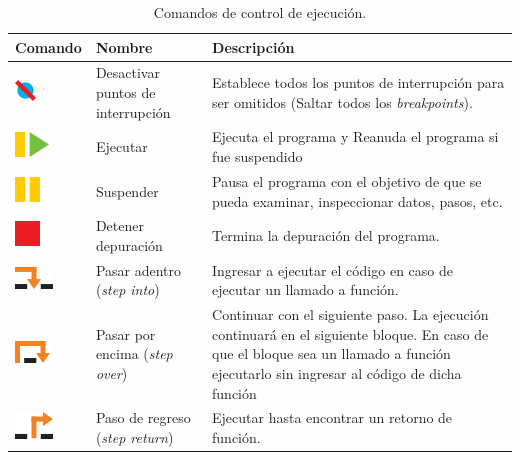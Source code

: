 \begin{table}[!htbp]
	\centering
	\begin{tabular}{ >{\centering\arraybackslash}m{2cm} >{\arraybackslash}m{2cm} >{\arraybackslash}m{7cm}}
		\hline
		Comando &  Nombre & Descripción \\
		\hline \hline
		\includegraphics{./Figures/skip_breakpoints.PNG} & 
		Desactivar puntos de interrupción & Establece todos los puntos de interrupción para ser omitidos (Saltar todos los \emph{breakpoints}). \\
		\hline
		\includegraphics{./Figures/resume.PNG} & 
		Ejecutar & Ejecuta el programa y Reanuda el programa si fue suspendido \\
		\hline
		\includegraphics{./Figures/suspend.PNG} & Suspender & 
		Pausa el programa con el objetivo de que se pueda examinar, inspeccionar datos, pasos, etc. \\
		\hline
		\includegraphics{./Figures/terminate.PNG} & Detener depuración & 
		Termina la depuración del programa. \\
		\hline
		\includegraphics{./Figures/step_into.PNG} & Pasar adentro (\emph{step into}) & Ingresar a ejecutar el código en caso de ejecutar un llamado a función. \\
		\hline
		\includegraphics{./Figures/step_over.PNG} & Pasar por encima (\emph{step over})& Continuar con el siguiente paso. La ejecución continuará en el siguiente bloque. En caso de que el bloque sea un llamado a función ejecutarlo sin ingresar al código de dicha función \\
		\hline
		\includegraphics{./Figures/step_return.PNG} & Paso de regreso (\emph{step return}) & 
		Ejecutar hasta encontrar un retorno de función. \\
		\hline
	\end{tabular}
	\par\caption{Comandos de control de ejecución.}
	\label{tabla:Comandos}
\end{table}

